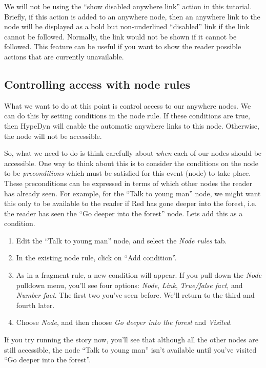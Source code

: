 \documentclass{article}
\begin{document}
We will not be using the ``show disabled anywhere link'' action in this tutorial. Briefly, if this action is added to an anywhere node, then an anywhere link to the node will be displayed as a bold but non-underlined ``disabled'' link if the link cannot be followed. Normally, the link would not be shown if it cannot be followed. This feature can be useful if you want to show the reader possible actions that are currently unavailable.

\subsection{Controlling access with node rules}

What we want to do at this point is control access to our anywhere nodes. We can do this by setting conditions in the node rule. If these conditions are true, then HypeDyn will enable the automatic anywhere links to this node. Otherwise, the node will not be accessible.

So, what we need to do is think carefully about \textit{when} each of our nodes should be accessible. One way to think about this is to consider the conditions on the node to be \textit{preconditions} which must be satisfied for this event (node) to take place. These preconditions can be expressed in terms of which other nodes the reader has already seen. For example, for the ``Talk to young man'' node, we might want this only to be available to the reader if Red has gone deeper into the forest, i.e. the reader has seen the ``Go deeper into the forest'' node. Lets add this as a condition.

\begin{enumerate}
  \item Edit the ``Talk to young man'' node, and select the \textit{Node rules} tab.
  \item In the existing node rule, click on ``Add condition''.
  \item As in a fragment rule, a new condition will appear. If you pull down the \textit{Node} pulldown menu, you'll see four options: \textit{Node}, \textit{Link}, \textit{True/false fact}, and \textit{Number fact}. The first two you've seen before. We'll return to the third and fourth later.
  \item Choose \textit{Node}, and then choose \textit{Go deeper into the
  forest} and \textit{Visited}.
\end{enumerate}

If you try running the story now, you'll see that although all the other nodes are still accessible, the node ``Talk to young man'' isn't available until you've visited ``Go deeper into the forest''.
\end{document}
